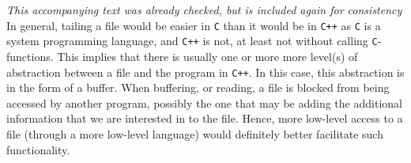 \textit{This accompanying text was already checked, but is included again for consistency} \\
In general, tailing a file would be easier in \texttt{C} than it would be in \texttt{C++} as \texttt{C} is a system programming language, and \texttt{C++} is not, at least not without calling \texttt{C}-functions. This implies that there is usually one or more more level(s) of abstraction between a file and the program in \texttt{C++}. In this case, this abstraction is in the form of a buffer. When buffering, or reading, a file is blocked from being accessed by another program, possibly the one that may be adding the additional information that we are interested in to the file. Hence, more low-level access to a file (through a more low-level language) would definitely better facilitate such functionality.
